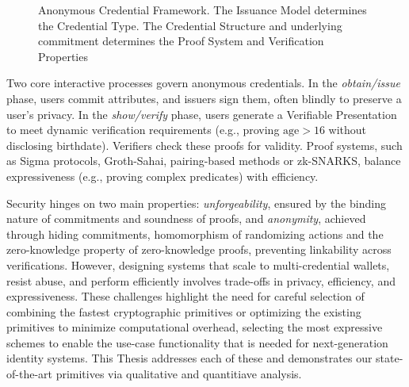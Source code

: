 \begin{figure}
{
    }
    \caption[Anonymous Credential Framework Diagram]{Anonymous Credential Framework. The Issuance Model determines the Credential Type. The Credential Structure and underlying commitment determines the Proof System and Verification Properties}
    \label{fig:chap1_anon_cred_framework}
\end{figure}

Two core interactive processes govern anonymous credentials. In the \emph{obtain/issue} phase, users commit attributes, and issuers sign them, often blindly to preserve a user's privacy. In the \emph{show/verify} phase, users generate a Verifiable Presentation to meet dynamic verification requirements (e.g., proving $ \text{age} > 16 $ without disclosing birthdate). Verifiers check these proofs for validity. Proof systems, such as Sigma protocols, Groth-Sahai, pairing-based methods or zk-SNARKS, balance expressiveness (e.g., proving complex predicates) with efficiency.

Security hinges on two main properties: \emph{unforgeability}, ensured by the binding nature of commitments and soundness of proofs, and \emph{anonymity}, achieved through hiding commitments, homomorphism of randomizing actions and the zero-knowledge property of zero-knowledge proofs, preventing linkability across verifications. However, designing systems that scale to multi-credential wallets, resist abuse, and perform efficiently involves trade-offs in privacy, efficiency, and expressiveness. These challenges highlight the need for careful selection of combining the fastest cryptographic primitives or optimizing the existing primitives to minimize computational overhead, selecting the most expressive schemes to enable the use-case functionality that is needed for next-generation identity systems.
This Thesis addresses each of these and demonstrates our state-of-the-art primitives via qualitative and quantitiave analysis. 




